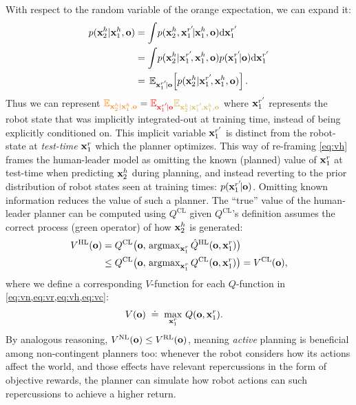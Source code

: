 With respect to the random variable of the orange expectation, we can expand it:
\begin{align*}
p(\bx^h_2|\bx^h_1,{\bo}) &= \int\! p(\bx^h_2,\bx^{r'}_1\!|\bx^h_1,{\bo}) \text{d}\bx^{r'}_1 \\
&= \int\! p(\bx^h_2|\bx^{r'}_1\!,\bx^h_1,{\bo}) p(\bx^{r'}_1\!|{\bo}) \text{d}\bx^{r'}_1 \\
&=\, \mathbb{E}_{\bx^{r'}_1\!|{\bo}}\!\left[p(\bx^h_2|\bx^{r'}_1\!,\bx^h_1,{\bo})\right].
\end{align*}
Thus we can represent $\orange{\mathbb{E}_{\bx^h_2|\bx^h_1,{\bo}}} = \red{\mathbb{E}_{\bx^{r'}_1\!|{\bo}}} \yellow{\mathbb{E}_{\bx^h_2|\bx^{r'}_1\!,\bx^h_1,{\bo}}}$
where $\mathbf{x}^{r'}_1$ represents the robot state that was implicitly integrated-out at training time, instead of being explicitly conditioned on. This implicit variable $\mathbf{x}^{r'}_1$ is distinct from the robot-state at \textit{test-time} $\mathbf{x}^r_1$ which the planner optimizes. 
%
This way of re-framing \cref{eq:vh} frames the human-leader model as omitting the known (planned) value of $\mathbf{x}^r_1$ at test-time when predicting $\mathbf{x}^h_2$ during planning, and instead reverting to the prior distribution of robot states seen at training times: $p(\mathbf{x}^{r'}_1\!|{\mathbf{o}})$. Omitting known information reduces the value of such a planner. The ``true'' value of the human-leader planner can be computed using $Q^{\text{CL}}$ given $Q^{\text{CL}}$'s definition assumes the correct process (green operator) of how $\mathbf{x}^h_2$ is generated:
\begin{align}
V^{\text{HL}}({\mathbf{o}})
&= Q^{\text{CL}}\big({\mathbf{o}},\,\operatorname{argmax}_{\mathbf{x}^r_1} \hat{Q}^{\text{HL}}({\mathbf{o}},\mathbf{x}^r_1)\big) \\
&\leq Q^{\text{CL}}\big({\mathbf{o}},\,\operatorname{argmax}_{\mathbf{x}^r_1} Q^{\text{CL}}({\mathbf{o}},\mathbf{x}^r_1)\big)
= V^{\text{CL}}({\mathbf{o}}),  \nonumber
\end{align}
%
where we define a corresponding $V$-function for each $Q$-function in \cref{eq:vn,eq:vr,eq:vh,eq:vc}:
\begin{align}
V({\mathbf{o}}) \;&\doteq\; \max_{\mathbf{x}^r_1} \, Q({\mathbf{o}},\mathbf{x}^r_1).
\end{align}
By analogous reasoning, $V^{\text{NL}}({\mathbf{o}}) \leq V^{\text{RL}}({\mathbf{o}})$, meaning \textit{active} planning is beneficial among non-contingent planners too: whenever the robot considers how its actions affect the world, and those effects have relevant repercussions in the form of objective rewards, the planner can simulate how robot actions can such repercussions to achieve a higher return.

